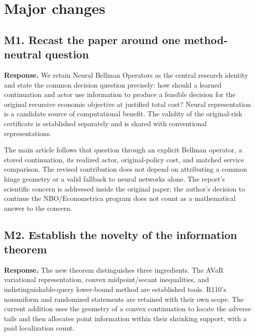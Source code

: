 \hypertarget{major-changes}{%
\section{Major changes}\label{major-changes}}

\hypertarget{m1.-recast-the-paper-around-one-method-neutral-question}{%
\subsection{M1. Recast the paper around one method-neutral question}\label{m1.-recast-the-paper-around-one-method-neutral-question}}

\textbf{Response.} We retain Neural Bellman Operators as the central research identity and state the common decision question precisely: how should a learned continuation and actor use information to produce a feasible decision for the original recursive economic objective at justified total cost? Neural representation is a candidate source of computational benefit. The validity of the original-risk certificate is established separately and is shared with conventional representations.

The main article follows that question through an explicit Bellman operator, a stored continuation, its realized actor, original-policy cost, and matched service comparison. The revised contribution does not depend on attributing a common hinge geometry or a valid fallback to neural networks alone. The report's scientific concern is addressed inside the original paper; the author's decision to continue the NBO/Econometrica program does not count as a mathematical answer to the concern.

\hypertarget{m2.-establish-the-novelty-of-the-information-theorem}{%
\subsection{M2. Establish the novelty of the information theorem}\label{m2.-establish-the-novelty-of-the-information-theorem}}

\textbf{Response.} The new theorem distinguishes three ingredients. The AVaR variational representation, convex midpoint/secant inequalities, and indistinguishable-query lower-bound method are established tools. R110's nonuniform and randomized statements are retained with their own scope. The current addition uses the geometry of a convex continuation to locate the adverse tails and then allocates point information within their shrinking support, with a paid localization count.

